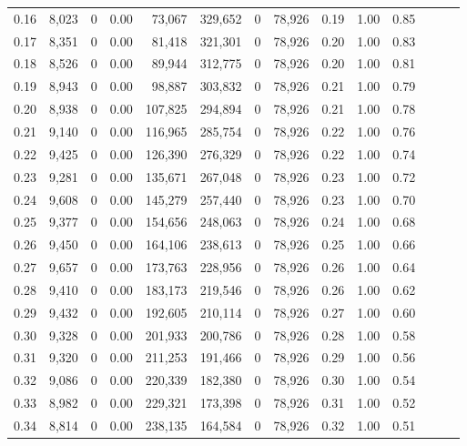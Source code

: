 \begin{tabular}{rrrrrrrrrrrrrr}
0.16 &  8,023 &      0 &  0.00 &   73,067 &  329,652 &       0 &  78,926 &  0.19 &  1.00 &      0.85 \\
0.17 &  8,351 &      0 &  0.00 &   81,418 &  321,301 &       0 &  78,926 &  0.20 &  1.00 &      0.83 \\
0.18 &  8,526 &      0 &  0.00 &   89,944 &  312,775 &       0 &  78,926 &  0.20 &  1.00 &      0.81 \\
0.19 &  8,943 &      0 &  0.00 &   98,887 &  303,832 &       0 &  78,926 &  0.21 &  1.00 &      0.79 \\
0.20 &  8,938 &      0 &  0.00 &  107,825 &  294,894 &       0 &  78,926 &  0.21 &  1.00 &      0.78 \\
0.21 &  9,140 &      0 &  0.00 &  116,965 &  285,754 &       0 &  78,926 &  0.22 &  1.00 &      0.76 \\
0.22 &  9,425 &      0 &  0.00 &  126,390 &  276,329 &       0 &  78,926 &  0.22 &  1.00 &      0.74 \\
0.23 &  9,281 &      0 &  0.00 &  135,671 &  267,048 &       0 &  78,926 &  0.23 &  1.00 &      0.72 \\
0.24 &  9,608 &      0 &  0.00 &  145,279 &  257,440 &       0 &  78,926 &  0.23 &  1.00 &      0.70 \\
0.25 &  9,377 &      0 &  0.00 &  154,656 &  248,063 &       0 &  78,926 &  0.24 &  1.00 &      0.68 \\
0.26 &  9,450 &      0 &  0.00 &  164,106 &  238,613 &       0 &  78,926 &  0.25 &  1.00 &      0.66 \\
0.27 &  9,657 &      0 &  0.00 &  173,763 &  228,956 &       0 &  78,926 &  0.26 &  1.00 &      0.64 \\
0.28 &  9,410 &      0 &  0.00 &  183,173 &  219,546 &       0 &  78,926 &  0.26 &  1.00 &      0.62 \\
0.29 &  9,432 &      0 &  0.00 &  192,605 &  210,114 &       0 &  78,926 &  0.27 &  1.00 &      0.60 \\
0.30 &  9,328 &      0 &  0.00 &  201,933 &  200,786 &       0 &  78,926 &  0.28 &  1.00 &      0.58 \\
0.31 &  9,320 &      0 &  0.00 &  211,253 &  191,466 &       0 &  78,926 &  0.29 &  1.00 &      0.56 \\
0.32 &  9,086 &      0 &  0.00 &  220,339 &  182,380 &       0 &  78,926 &  0.30 &  1.00 &      0.54 \\
0.33 &  8,982 &      0 &  0.00 &  229,321 &  173,398 &       0 &  78,926 &  0.31 &  1.00 &      0.52 \\
0.34 &  8,814 &      0 &  0.00 &  238,135 &  164,584 &       0 &  78,926 &  0.32 &  1.00 &      0.51 \\

\end{tabular}
